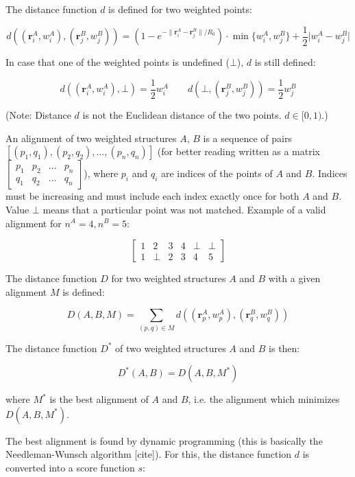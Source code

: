 \documentclass{article}
\begin{document}
The distance function \(d\) is defined for two weighted points:

\[
  d \left( (\mathbf{r}^A_i, w^A_i), (\mathbf{r}^B_j, w^B_j) \right) 
  = \left( 1 - e^{-\lVert \mathbf{r}^A_i-\mathbf{r}^B_j \rVert / R_0} \right) \cdot \min\{ w^A_i, w^B_j \} + \frac{1}{2} \lvert w^A_i-w^B_j \rvert
\]

In case that one of the weighted points is undefined (\(\bot\)), \(d\)
is still defined:

\[
  d \left( (\mathbf{r}^A_i, w^A_i), \bot \right) = \frac{1}{2} w^A_i \qquad 
  d \left( \bot, (\mathbf{r}^B_j, w^B_j) \right) = \frac{1}{2} w^B_j
\]

(Note: Distance \(d\) is not the Euclidean distance of the two points.
\(d \in [0,1)\).)

An alignment of two weighted structures \(A\), \(B\) is a sequence of
pairs \([(p_1, q_1), (p_2, q_2), ..., (p_n, q_n)]\) (for better reading
written as a matrix
\(\begin{bmatrix}p_1&p_2&...&p_n\\q_1&q_2&...&q_n\end{bmatrix}\)), where
\(p_i\) and \(q_i\) are indices of the points of \(A\) and \(B\).
Indices must be increasing and must include each index exactly once for
both \(A\) and \(B\). Value \(\bot\) means that a particular point was
not matched. Example of a valid alignment for \(n^A = 4, n^B = 5\):

\[\begin{bmatrix}1&2&3&4&\bot&\bot\\1&\bot&2&3&4&5\end{bmatrix}\]

The distance function \(D\) for two weighted structures \(A\) and \(B\) with a given alignment \(M\) is defined:

\[  D(A, B, M) = \sum\limits_{(p, q) \in M}{d \left( (\mathbf{r}^A_{p}, w^A_{p}), (\mathbf{r}^B_{q}, w^B_{q}) \right)}  \]

The distance function \(D^*\) of two weighted structures \(A\) and \(B\) is then:

\[  D^*(A, B) = D(A, B, M^*)  \]

where \(M^*\) is the best alignment of \(A\) and \(B\), i.e. the alignment which minimizes \(D(A, B, M^*)\).

The best alignment is found by dynamic programming (this is basically
the Needleman-Wunsch algorithm {[}cite{]}). For this, the distance
function \(d\) is converted into a score function \(s\):
\end{document}
